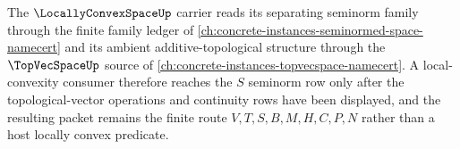 The $\LocallyConvexSpaceUp$ carrier reads its separating seminorm family through the finite family ledger of \autoref{ch:concrete-instances-seminormed-space-namecert} and its ambient additive-topological structure through the $\TopVecSpaceUp$ source of \autoref{ch:concrete-instances-topvecspace-namecert}. A local-convexity consumer therefore reaches the $S$ seminorm row only after the topological-vector operations and continuity rows have been displayed, and the resulting packet remains the finite route $V,T,S,B,M,H,C,P,N$ rather than a host locally convex predicate.
